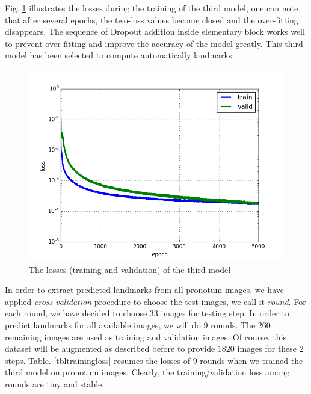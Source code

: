 \documentclass[review]{elsarticle}
\begin{document}
Fig. \ref{figloss3} illustrates the losses during the training of the third model, one can note that after several epochs, the two-loss values become closed and the over-fitting disappears.  The sequence of Dropout addition inside elementary block works well to prevent over-fitting and improve the accuracy of the model greatly. This third model has been selected to compute automatically landmarks.

\begin{figure}[htbp]
    \centering
    \includegraphics[scale=0.4]{images/model3_loss}
    \caption{The losses (training and validation) of the third model}
    \label{figloss3}
\end{figure}

In order to extract predicted landmarks from all pronotum images, we have applied \textit{cross-validation} procedure to choose the test images, we call it \textit{round}. For each round, we have decided to choose $33$ images for testing step. In order to predict landmarks for all available images, we will do $9$ rounds. The $260$ remaining images are used as training and validation images. Of course, this dataset will be augmented as described before to provide $1820$ images for these $2$ steps. Table. \ref{tbltrainingloss} resumes the losses of $9$ rounds when we trained the third model on pronotum images. Clearly, the training/validation loss among rounds are tiny and stable.
\end{document}
